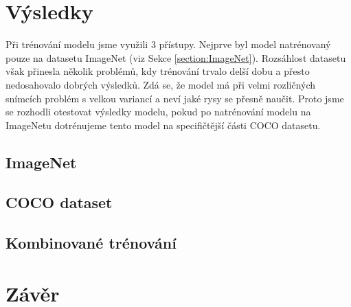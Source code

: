 \documentclass[12pt, a4paper]{article}
\begin{document}
    \section{Výsledky}
    Při trénování modelu jsme využili 3 přístupy. Nejprve byl model natrénovaný pouze na datasetu ImageNet (viz Sekce \ref{section:ImageNet}). Rozsáhlost datasetu však přinesla několik problémů, kdy trénování trvalo delší dobu a přesto nedosahovalo dobrých výsledků. Zdá se, že model má při velmi rozličných snímcích problém s velkou variancí a neví jaké rysy se přesně naučit. Proto jsme se rozhodli otestovat výsledky modelu, pokud po natrénování modelu na ImageNetu dotrénujeme tento model na specifičtější části COCO datasetu.
    
    \subsection{ImageNet}\label{results:imagenet}
    
    \subsection{COCO dataset}\label{results:coco}
    
    \subsection{Kombinované trénování}\label{results:combine}
    
    
    
    \section{Závěr}
    
    \newpage
    
    
    
\end{document}
